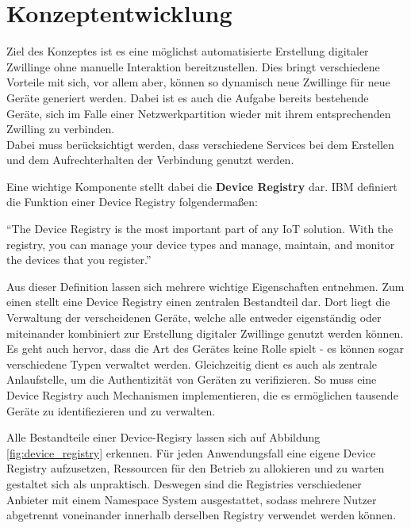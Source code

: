 \chapter{Konzeptentwicklung}

Ziel des Konzeptes ist es eine möglichst automatisierte Erstellung digitaler Zwillinge ohne manuelle Interaktion bereitzustellen. Dies bringt verschiedene Vorteile mit sich, vor allem aber, können so dynamisch neue Zwillinge für neue Geräte generiert werden. Dabei ist es auch die Aufgabe bereits bestehende Geräte, sich im Falle einer Netzwerkpartition wieder mit ihrem entsprechenden Zwilling zu verbinden.\\
Dabei muss berücksichtigt werden, dass verschiedene Services bei dem Erstellen und dem Aufrechterhalten der Verbindung genutzt werden.

Eine wichtige Komponente stellt dabei die \textbf{Device Registry} dar. IBM definiert die Funktion einer Device Registry folgendermaßen:

\begin{definition}
    \enquote{The Device Registry is the most important part of any IoT solution. With the registry, you can manage your device types and manage, maintain, and monitor the devices that you register.}\autocite{ibm_dr}\label{def:device_registry}
\end{definition}

Aus dieser Definition lassen sich mehrere wichtige Eigenschaften entnehmen. Zum einen stellt eine Device Registry einen zentralen Bestandteil dar. Dort liegt die Verwaltung der verscheidenen Geräte, welche alle entweder eigenständig oder miteinander kombiniert zur Erstellung digitaler Zwillinge genutzt werden können. Es geht auch hervor, dass die Art des Gerätes keine Rolle spielt - es können sogar verschiedene Typen verwaltet werden. Gleichzeitig dient es auch als zentrale Anlaufstelle, um die Authentizität von Geräten zu verifizieren. So muss eine Device Registry auch Mechanismen implementieren, die es ermöglichen tausende Geräte zu identifiezieren und zu verwalten.

Alle Bestandteile einer Device-Regisry lassen sich auf Abbildung \vref{fig:device_registry} erkennen. Für jeden Anwendungsfall eine eigene Device Registry aufzusetzen, Ressourcen für den Betrieb zu allokieren und zu warten gestaltet sich als unpraktisch. 
Deswegen sind die Registries verschiedener Anbieter  mit einem Namespace System ausgestattet, sodass mehrere Nutzer abgetrennt voneinander innerhalb derselben Registry verwendet werden können.

